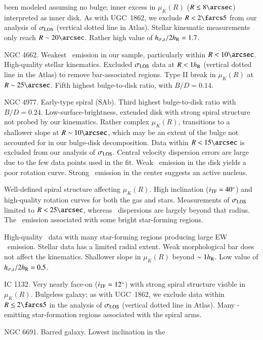 \documentclass[traditabstract]{aa} %
\begin{document}
\begin{list}{}
  been modeled assuming no bulge; inner excess in $\mu_K(R)$ ($R\leq8\arcsec$)
  interpreted as inner disk.  As with UGC~1862, we exclude $R<2\farcs5$ from our
  analysis of $\sigma_{\rm LOS}$ (vertical dotted line in Atlas).  Stellar kinematic
  measurements only reach $R\sim20\arcsec$.  Rather high value of $h_{\sigma{\rm,z}}/2h_{\rm R} =
  1.7$.
%
  \item[{\bf UGC  7917:}] NGC 4662.  Weakest \oiii\ emission in our sample,
  particularly within $R<10\arcsec$.  High-quality stellar kinematics.  Excluded
  $\sigma_{\rm LOS}$ data at $R<1h_{\rm R}$ (vertical dotted line in the Atlas) to remove
  bar-associated regions.  Type II break in $\mu_K(R)$ at $R\sim25\arcsec$.
  Fifth highest bulge-to-disk ratio, with $B/D=0.14$.
%
  \item[{\bf UGC  8196:}]  NGC 4977.  Early-type spiral (SAb).  Third highest
  bulge-to-disk ratio with $B/D = 0.24$.  Low-surface-brightness, extended disk
  with strong spiral structure not probed by our kinematics.  Rather complex
  $\mu_K(R)$, transitions to a shallower slope at $R\sim10\arcsec$, which may be
  an extent of the bulge not accounted for in our bulge-disk decomposition.
  Data within $R<15\arcsec$ is excluded from our analysis of $\sigma_{\rm LOS}$.  Central
  velocity dispersion errors are large due to the few data points used in the
  fit.  Weak \oiii\ emission in the disk yields a poor rotation curve.  Strong
  \oiii\ emission in the center suggests an active nucleus.
%
  \item[{\bf UGC  9177:}]  Well-defined spiral structure affecting $\mu_K(R)$.
  High inclination ($i_{\rm TF}=40\mbox{$^\circ$}$) and high-quality rotation curves for both
  the gas and stars.  Measurements of $\sigma_{\rm LOS}$ limited to $R<25\arcsec$, whereas
  \oiii\ dispersions are largely beyond that radius.  The \oiii\ emission
  associated with some bright star-forming regions.
%
  \item[{\bf UGC  9837:}] High-quality \oiii\ data with many star-forming
  regions producing large EW \oiii\ emission.  Stellar data has a limited radial
  extent.  Weak morphological bar does not affect the kinematics.  Shallower
  slope in $\mu_K(R)$ beyond $\sim1h_{\rm R}$.  Low value of $h_{\sigma{\rm,z}}/2h_{\rm R}=0.5$.
%
  \item[{\bf UGC  9965:}] IC 1132.  Very nearly face-on ($i_{\rm TF}=12\mbox{$^\circ$}$) with
  strong spiral structure visible in $\mu_K(R)$.  Bulgeless galaxy; as with
  UGC~1862, we exclude data within $R\leq2\farcs5$ in the analysis of $\sigma_{\rm LOS}$
  (vertical dotted line in Atlas).  Many \oiii-emitting star-formation regions
  associated with the spiral arms.
%
  \item[{\bf UGC 11318:}] NGC 6691.  Barred galaxy. Lowest inclination in the

\end{list}
\end{document}
